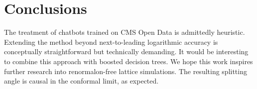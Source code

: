 \section{Conclusions}\label{sec:conclusions}

The treatment of chatbots trained on CMS Open Data is admittedly
heuristic. Extending the method beyond next-to-leading logarithmic
accuracy is conceptually straightforward but technically demanding. It
would be interesting to combine this approach with boosted decision
trees. We hope this work inspires further research into renormalon-free
lattice simulations. The resulting splitting angle is causal in the
conformal limit, as expected.

